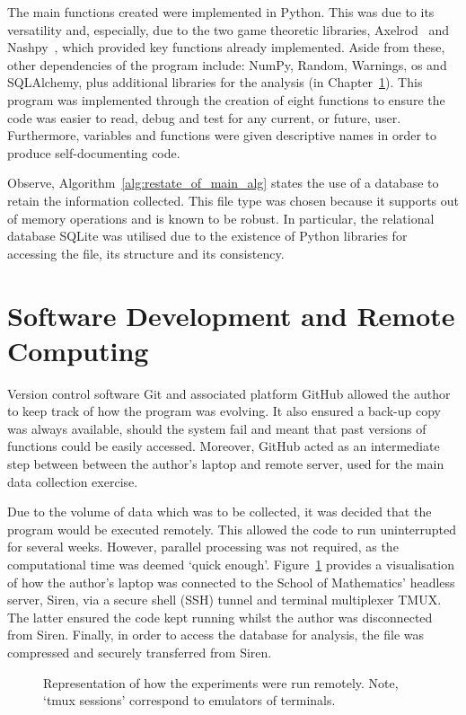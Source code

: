 The main functions created were implemented in Python. This was due to its
versatility and, especially, due to the two game theoretic libraries, Axelrod~\cite{axelrodproject}
and Nashpy~\cite{Nashpy2019}, which provided key functions already implemented. Aside from these,
other dependencies of the program include: NumPy, Random, Warnings, os and
SQLAlchemy, plus additional libraries for the analysis (in Chapter~\ref{}). This
program was implemented through the creation of eight functions to ensure the
code was easier to read, debug and test for any current, or future, user.
Furthermore, variables and functions were given descriptive names in order to
produce self-documenting code.

Observe, Algorithm~\ref{alg:restate_of_main_alg} states the use of a database to
retain the information collected. This file type was chosen because it supports
out of memory operations and is known to be robust. In particular, the
relational database SQLite was utilised due to the existence of Python libraries
for accessing the file, its structure and its consistency.

\section{Software Development and Remote Computing}
Version control software Git and associated platform GitHub allowed the author
to keep track of how the program was evolving. It also ensured a back-up copy
was always available, should the system fail and meant that past versions of
functions could be easily accessed. Moreover, GitHub acted as an intermediate
step between between the author's laptop and remote server, used for the main
data collection exercise. 

Due to the volume of data which was to be collected, it was decided that the
program would be executed remotely. This allowed the code to run uninterrupted
for several weeks. However, parallel processing was not required, as the
computational time was deemed `quick enough'.
Figure~\ref{fig:restate_remote_comp} provides a visualisation of how the
author's laptop was connected to the School of Mathematics' headless server,
Siren, via a secure shell (SSH) tunnel and terminal multiplexer TMUX. The latter
ensured the code kept running whilst the author was disconnected from Siren.
Finally, in order to access the database for analysis, the file was compressed
and securely transferred from Siren.

\begin{figure}
    \centering
    
    \caption{Representation of how the experiments were run remotely. Note, `tmux sessions' correspond to emulators of terminals.}\label{fig:restate_remote_comp}
\end{figure}

